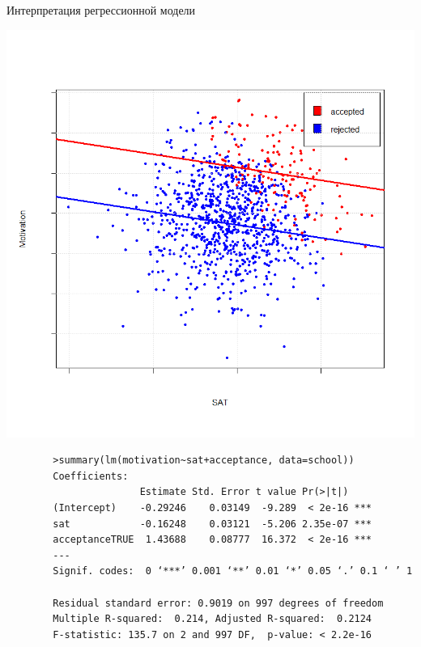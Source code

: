 \documentclass[9pt,pdf,utf8,hyperref={unicode},aspectratio=169]{beamer}
\begin{document}
\begin{frame}[fragile]{Интерпретация регрессионной модели}	
	\begin{center}
		\includegraphics[height=0.5\textheight]{causality2.png}
	\end{center}	
	{\footnotesize
		\begin{verbatim}
		>summary(lm(motivation~sat+acceptance, data=school))
		Coefficients:
		               Estimate Std. Error t value Pr(>|t|)    
		(Intercept)    -0.29246    0.03149  -9.289  < 2e-16 ***
		sat            -0.16248    0.03121  -5.206 2.35e-07 ***
		acceptanceTRUE  1.43688    0.08777  16.372  < 2e-16 ***
		---
		Signif. codes:  0 ‘***’ 0.001 ‘**’ 0.01 ‘*’ 0.05 ‘.’ 0.1 ‘ ’ 1
		
		Residual standard error: 0.9019 on 997 degrees of freedom
		Multiple R-squared:  0.214,	Adjusted R-squared:  0.2124 
		F-statistic: 135.7 on 2 and 997 DF,  p-value: < 2.2e-16
		\end{verbatim}		
	}		
\end{frame}
\end{document}
